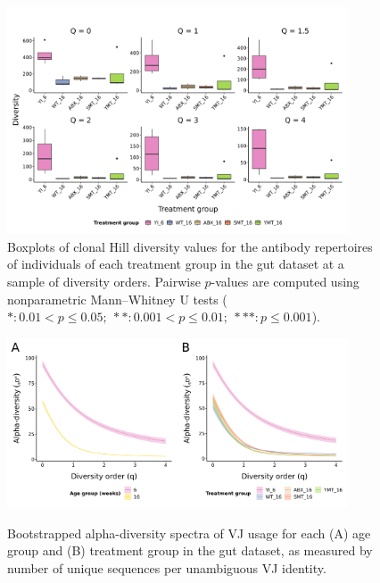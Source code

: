 \begin{figure}
\centering
\includegraphics[width = 0.9\textwidth]{_Figures/png/igseq-gut-clone-diversity-solo-groups}
\caption{Boxplots of clonal Hill diversity values for the antibody repertoires of individuals of each treatment group in the \igseq gut dataset at a sample of diversity orders. Pairwise $p$-values are computed using nonparametric Mann–Whitney U tests ($*: 0.01 < p \leq 0.05;~**: 0.001 < p \leq 0.01;~***: p \leq 0.001$).}
\label{fig:igseq-gut-clone-diversity-solo-groups}
\end{figure}

\begin{figure}
\centering
\includegraphics[width = 0.9\textwidth]{_Figures/png/igseq-gut-VJ-diversity-alpha}
\begin{subfigure}{0em}
\label{fig:igseq-gut-VJ-diversity-alpha-age}
\end{subfigure}
\begin{subfigure}{0em}
\label{fig:igseq-gut-VJ-diversity-alpha-groups}
\end{subfigure}
\caption{Bootstrapped alpha-diversity spectra of VJ usage for each (A) age group and (B) treatment group in the \igseq gut dataset, as measured by number of unique sequences per unambiguous VJ identity.}
\label{fig:igseq-gut-VJ-diversity-alpha}
\end{figure}

